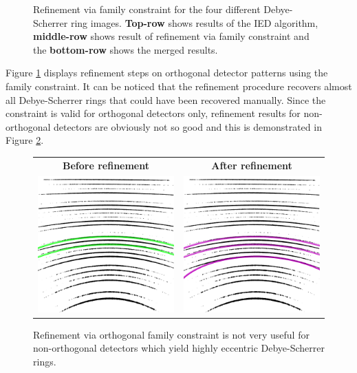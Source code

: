 \documentclass[preprint]{iucr}              %
\newcommand\dsr{Debye-Scherrer ring}
\newcommand\dsrs{Debye-Scherrer rings}
\begin{document}
\begin{figure}
\begin{tabular}{ll|l|l|l}
\end{tabular}

\label{fig:family1}
\caption {Refinement via family constraint for the four different {\dsr} images.
\textbf{Top-row} shows results of the IED algorithm, \textbf{middle-row} shows
result of refinement via family constraint and the \textbf{bottom-row} shows the
merged results.}  

\end{figure}

Figure \ref{fig:family1} displays refinement steps on orthogonal detector
patterns using the family constraint. 
It can be noticed that the refinement procedure recovers almost all \dsrs{} that
could have been recovered manually. 
Since the constraint is valid for orthogonal detectors only, refinement results
for non-orthogonal detectors are obviously not so good and this is demonstrated
in Figure \ref{fig:family_tilted}.  

\begin{figure}
\centering
\begin{tabular}{cc}

\textbf{Before refinement} & \textbf{After refinement}
\\
\includegraphics[width=.35\linewidth,height=.45\textheight,keepaspectratio]{withoutRanks/o_tilted_006__woRank.png}
&
\includegraphics[width=.35\linewidth,height=.45\textheight,keepaspectratio]{Merged/o_tilted_006__Merged.png}
\end{tabular}

\label{fig:family_tilted}
\caption {Refinement via orthogonal family constraint is not very useful for
non-orthogonal detectors which yield highly eccentric \dsrs.} 
\end{figure}
\end{document}
